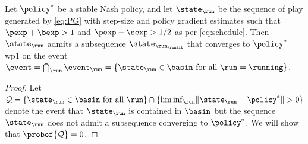 \begin{proposition}
\label{prop:subsequence}
Let $\eq$ be a stable Nash policy, and let $\curr$ be the sequence of play generated by \eqref{eq:PG} with step-size and policy gradient estimates such that $\pexp + \bexp >1$ and $\pexp - \sexp > 1/2$ as per \eqref{eq:schedule}.
Then $\curr$ admits a subsequence $\state_{\run_{\runalt}}$ that converges to $\eq$ \acl{wp1} on the event $\event = \intersect_{\run} \curr[\event] = \{\curr\in\basin \text{ for all } \run=\running\}$.
\end{proposition}

\begin{proof}
Let $\mathcal{Q} = \{ \text{$\curr\in\basin$ for all $\run$} \} \cap \{ \liminf_{\run} \norm{\curr - \eq} > 0 \}$ denote the event that $\curr$ is contained in $\basin$ but the sequence $\curr$ does not admit a subsequence converging to $\eq$.
We will show that $\probof{\mathcal{Q}} = 0$.


\end{proof}
